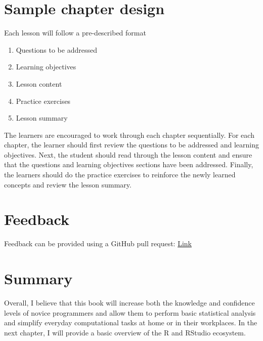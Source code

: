 \documentclass[
  letterpaper,
  DIV=11,
  numbers=noendperiod]{scrreprt}
\begin{document}
\section*{Sample chapter design}\label{sample-chapter-design}


Each lesson will follow a pre-described format

\begin{enumerate}
\def\labelenumi{\roman{enumi}.}
\item
  Questions to be addressed
\item
  Learning objectives
\item
  Lesson content
\item
  Practice exercises
\item
  Lesson summary
\end{enumerate}

The learners are encouraged to work through each chapter sequentially.
For each chapter, the learner should first review the questions to be
addressed and learning objectives. Next, the student should read through
the lesson content and ensure that the questions and learning objectives
sections have been addressed. Finally, the learners should do the
practice exercises to reinforce the newly learned concepts and review
the lesson summary.

\section*{Feedback}\label{feedback}


Feedback can be provided using a GitHub pull request:
\href{https://github.com/wokech/r4novice}{Link}

\section*{Summary}\label{summary}


Overall, I believe that this book will increase both the knowledge and
confidence levels of novice programmers and allow them to perform basic
statistical analysis and simplify everyday computational tasks at home
or in their workplaces. In the next chapter, I will provide a basic
overview of the R and RStudio ecosystem.
\end{document}
